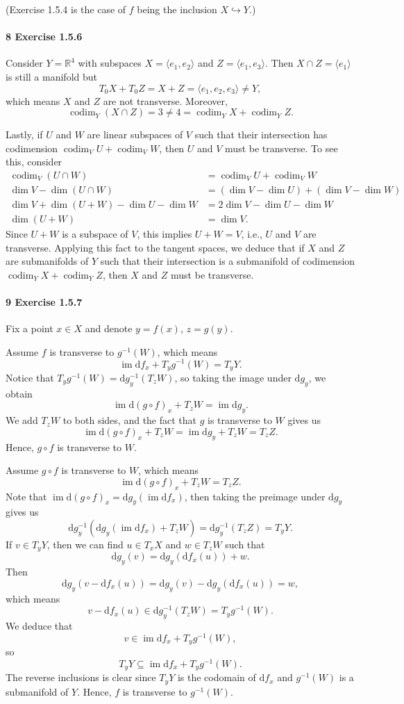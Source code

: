 \documentclass[12pt]{article}
\newcommand{\pnum}[1]{\paragraph{#1}}
\theoremstyle{definition}
\newcommand{\R}{\mathbb{R}}
\newcommand{\<}{\langle}
\renewcommand{\>}{\rangle}
\newcommand{\seq}{\subseteq}
\DeclareMathOperator{\im}{im}
\newcommand{\inc}{\hookrightarrow}
\newcommand{\dd}{\mathrm{d}}
\DeclareMathOperator{\codim}{codim}
\begin{document}
(Exercise 1.5.4 is the case of $f$ being the inclusion $X \inc Y$.)

\pnum{8 Exercise 1.5.6}

Consider $Y = \R^4$ with subspaces $X = \<e_1, e_2\>$ and $Z = \<e_1, e_3\>$.
Then $X \cap Z = \<e_1\>$ is still a manifold but
\[
    T_0X + T_0Z
        = X + Z
        = \<e_1, e_2, e_3\>
        \ne Y,
\]
which means $X$ and $Z$ are not transverse.
Moreover,
\[
    \codim_Y(X \cap Z)
        = 3 
        \ne 4
        = \codim_Y X + \codim_Y Z.
\]

Lastly, if $U$ and $W$ are linear subspaces of $V$ such that their intersection has codimension $\codim_VU + \codim_VW$, then $U$ and $V$ must be transverse.
To see this, consider
\begin{align*}
    \codim_V(U \cap W)
        &= \codim_VU + \codim_VW \\
    \dim V - \dim(U \cap W)
        &= (\dim V - \dim U) + (\dim V - \dim W) \\
    \dim V + \dim(U + W) - \dim U - \dim W
        &= 2\dim V - \dim U - \dim W \\
    \dim(U + W) 
        &= \dim V.
\end{align*}
Since $U + W$ is a subspace of $V$, this implies $U + W = V$, i.e., $U$ and $V$ are transverse.
Applying this fact to the tangent spaces, we deduce that if $X$ and $Z$ are submanifolds of $Y$ such that their intersection is a submanifold of codimension $\codim_YX + \codim_YZ$, then $X$ and $Z$ must be transverse.

\pnum{9 Exercise 1.5.7}

Fix a point $x \in X$ and denote $y = f(x)$, $z = g(y)$.

Assume $f$ is transverse to $g^{-1}(W)$, which means
\[
    \im\dd{f}_x + T_yg^{-1}(W) = T_yY.
\]
Notice that $T_yg^{-1}(W) = \dd{g}_y^{-1}(T_zW)$, so taking the image under $\dd{g}_y$, we obtain
\[
    \im\dd(g \circ f)_x + T_zW = \im\dd{g}_y.
\]
We add $T_zW$ to both sides, and the fact that $g$ is transverse to $W$ gives us
\[
    \im\dd(g \circ f)_x + T_zW
        = \im\dd{g}_y + T_zW
        = T_zZ.
\]
Hence, $g \circ f$ is transverse to $W$.

Assume $g \circ f$ is transverse to $W$, which means
\[
    \im \dd(g \circ f)_x + T_zW = T_zZ.
\]
Note that $\im\dd(g \circ f)_x = \dd{g}_y(\im\dd{f}_x)$, then taking the preimage under $\dd{g}_y$ gives us
\[
    \dd{g}_y^{-1}( \dd{g}_y(\im\dd{f}_x) + T_zW)
        = \dd{g}_y^{-1}(T_zZ)
        = T_yY.
\]
If $v \in T_yY$, then we can find $u \in T_xX$ and $w \in T_zW$ such that
\[
    \dd{g}_y(v) = \dd{g}_y(\dd{f}_x(u)) + w.
\]
Then
\[
    \dd{g}_y(v - \dd{f}_x(u))
        = \dd{g}_y(v) - \dd{g}_y(\dd{f}_x(u))
        = w,
\]
which means
\[
    v - \dd{f}_x(u) \in \dd{g}_y^{-1}(T_zW) = T_yg^{-1}(W).
\]
We deduce that
\[
    v \in \im\dd{f}_x + T_yg^{-1}(W),
\]
so
\[
    T_yY \seq \im\dd{f}_x + T_yg^{-1}(W).
\]
The reverse inclusions is clear since $T_yY$ is the codomain of $\dd{f}_x$ and $g^{-1}(W)$ is a submanifold of $Y$.
Hence, $f$ is transverse to $g^{-1}(W)$.
\end{document}
